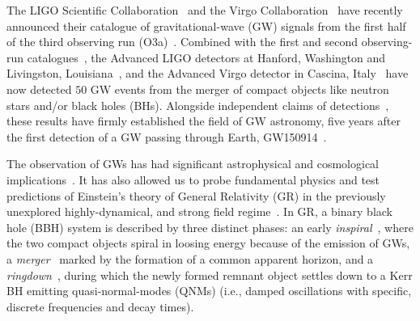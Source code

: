 The LIGO Scientific Collaboration~\cite{lsc} and the Virgo
Collaboration~\cite{Virgo} have recently announced their catalogue of
gravitational-wave (GW) signals from the first
half of the third observing run (O3a)~\cite{Abbott:2020niy}. Combined
with the first and second observing-run catalogues~\cite{LIGOScientific:2018mvr}, the Advanced LIGO detectors at Hanford,
Washington and Livingston, Louisiana~\cite{Aasi:2014mqd},
and the Advanced Virgo detector in Cascina,
Italy~\cite{TheVirgo:2014hva} have now detected $50$ GW
events from the merger of compact objects like neutron stars and/or
black holes (BHs). Alongside independent claims of
detections~\cite{Nitz:2018imz,Nitz:2019hdf,Venumadhav:2019lyq,Zackay:2019btq}, these results have firmly established the field of GW astronomy, five years after the first detection of a GW passing through Earth, GW150914~\cite{Abbott:2016blz}.

The observation of GWs has had significant astrophysical and cosmological
implications~\cite{TheLIGOScientific:2016htt,GBM:2017lvd,Monitor:2017mdv,Abbott:2017xzu}. It
has also allowed us to probe fundamental
physics and test predictions of Einstein's theory of General Relativity
(GR) in the previously unexplored highly-dynamical, and strong field
regime~\cite{TheLIGOScientific:2016src,Abbott:2018lct,LIGOScientific:2019fpa,Abbott:2020jks}. In GR, a binary black hole (BBH) system is described by
three distinct phases: an early \textit{inspiral}~\cite{Blanchet:2013haa}, where the two
compact objects spiral in loosing energy because of the emission of GWs, a \textit{merger}~\cite{Pretorius:2005gq,Campanelli:2005dd,Baker:2005vv} marked by the
formation of a common apparent horizon, and a \textit{ringdown}~\cite{Vishveshwara:1970zz,Vishveshwara:1970cc,Press:1971wr,Chandrasekhar:1975zza,Detweiler:1980gk}, during which the newly formed remnant object settles down to a Kerr BH emitting quasi-normal-modes (QNMs) (i.e., damped oscillations with specific, discrete frequencies and decay times).

